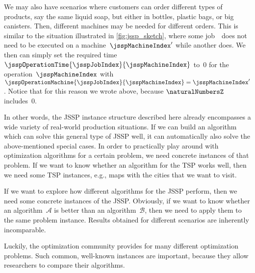 We may also have scenarios where customers can order different types of products, say the same liquid soap, but either in bottles, plastic bags, or big canisters.
Then, different machines may be needed for different orders.
This is similar to the situation illustrated in \autoref{fig:jssp_sketch}, where some job~\jsspJobIndex\ does not need to be executed on a machine~$\jsspMachineIndex'$ while another does.
We then can simply set the required time~$\jsspOperationTime{\jsspJobIndex}{\jsspMachineIndex}$ to~0 for the operation~$\jsspMachineIndex$ with~$\jsspOperationMachine{\jsspJobIndex}{\jsspMachineIndex}=\jsspMachineIndex'$.
Notice that for this reason we wrote \inQuotes{$\jsspOperationTime{\jsspJobIndex}{\jsspMachineIndex}\in\naturalNumbersZ$} above, because $\naturalNumbersZ$ includes~0.

In other words, the \gls{JSSP} instance structure described here already encompasses a wide variety of real-world production situations.
If we can build an algorithm which can solve this general type of \gls{JSSP} well, it can automatically also solve the above-mentioned special cases.
\endhsection%
%
%
\label{sec:jsspBenchmarkInstances}%
%
In order to practically play around with optimization algorithms for a certain problem, we need concrete instances of that problem.
If we want to know whether an algorithm for the \gls{TSP} works well, then we need some \gls{TSP} instances, e.g., maps with the cities that we want to visit.

If we want to explore how different algorithms for the \gls{JSSP} perform, then we need some concrete instances of the \gls{JSSP}.
Obviously, if we want to know whether an algorithm~$\mathcal{A}$ is better than an algorithm~$\mathcal{B}$, then we need to apply them to the same problem instance.
Results obtained for different scenarios are inherently incomparable.

Luckily, the optimization community provides  for many different optimization problems.
Such common, well-known instances are important, because they allow researchers to compare their algorithms.

